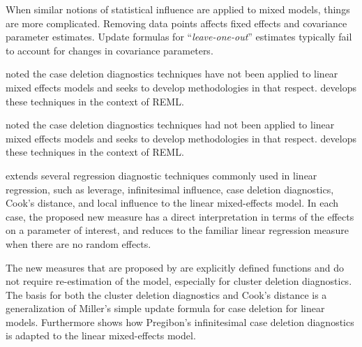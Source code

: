 \documentclass[12pt, a4paper]{report}
\theoremstyle{plain}
\theoremstyle{definition}
\theoremstyle{remark}
\begin{document}
When similar notions of statistical influence are applied to mixed models,
things are more complicated. Removing data points affects fixed effects and covariance parameter estimates.
Update formulas for “\textit{leave-one-out}” estimates typically fail to account for changes in covariance
parameters. 
%
%

\citet{Christiansen} noted the case deletion diagnostics techniques have not been applied to linear mixed effects models and seeks to develop methodologies in that respect. \citet{Christiansen} develops these techniques in the context of REML.

\citet{CPJ} noted the case deletion diagnostics techniques had not been applied to linear mixed effects models and seeks to develop methodologies in that respect. \citet{CPJ} develops these techniques in the context of REML.



\citet{Demi} extends several regression diagnostic techniques commonly used in linear regression, such as leverage, infinitesimal influence, case deletion diagnostics, Cook's distance, and local influence to the linear mixed-effects model. In each case, the proposed new measure has a direct interpretation in terms of the effects on a parameter of interest, and reduces to the familiar linear regression measure when there are no random effects. 

The new measures that are proposed by \citet{Demi} are explicitly defined functions and do not require re-estimation of the model, especially for cluster deletion diagnostics. The basis for both the cluster deletion diagnostics and Cook's distance is a generalization of Miller's simple update formula for case deletion for linear models. Furthermore \citet{Demi} shows how Pregibon's infinitesimal case deletion diagnostics is adapted to the linear mixed-effects model. 
\end{document}
